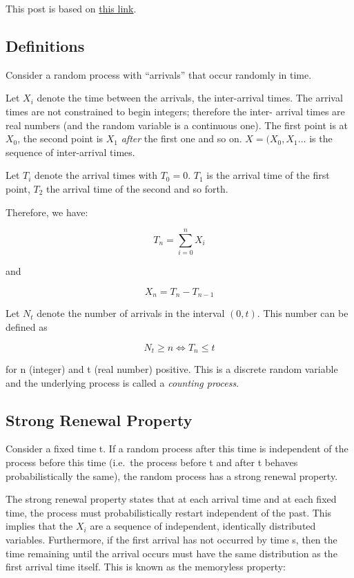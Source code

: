 
This post is based on
\href{http://www.math.uah.edu/stat/poisson/index.html}{this link}.

\subsection{Definitions}\label{definitions}

Consider a random process with ``arrivals'' that occur randomly in time.

Let \(X_i\) denote the time between the arrivals, the inter-arrival times. The arrival times are not constrained to begin integers; therefore the inter- arrival times are real numbers (and the random variable is a continuous one). The first point is at \(X_0\), the second point is \(X_1\) \emph{after} the first one and so on. \(X = (X_0, X_1...\) is the sequence of inter-arrival times.

Let \(T_i\) denote the arrival times with \(T_0=0\). \(T_1\) is the arrival time of the first point, \(T_2\) the arrival time of the second and so forth.

Therefore, we have:

\[ T_n = \sum_{i=0}^n X_i\]

and

\[ X_n = T_n - T_{n-1}\]

Let \(N_t\) denote the number of arrivals in the interval $(0,t)$. This number can be defined as

\[N_t \geq n  \Leftrightarrow T_n \leq t \]

for n (integer) and t (real number) positive. This is a discrete random variable and the underlying process is called a \emph{counting process}.

\subsection{Strong Renewal Property}\label{strong-renewal-property}

Consider a fixed time t. If a random process after this time is independent of the process before this time (i.e.~the process before t and after t behaves probabilistically the same), the random process has a strong renewal property.

The strong renewal property states that at each arrival time and at each fixed time, the process must probabilistically restart independent of the past. This implies that the \(X_i\) are a sequence of independent, identically distributed variables. Furthermore, if the first arrival has not occurred by time s, then the time remaining until the arrival occurs must have the same distribution as the first arrival time itself. This is known as the memoryless property:

